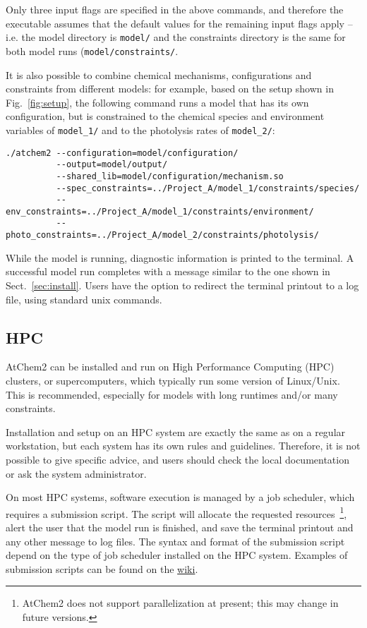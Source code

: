 Only three input flags are specified in the above commands, and
therefore the executable assumes that the default values for the
remaining input flags apply -- i.e. the model directory is
\texttt{model/} and the constraints directory is the same for both
model runs (\texttt{model/constraints/}.

It is also possible to combine chemical mechanisms, configurations and
constraints from different models: for example, based on the setup
shown in Fig.~\ref{fig:setup}, the following command runs a model that
has its own configuration, but is constrained to the chemical species
and environment variables of \texttt{model\_1/} and to the photolysis
rates of \texttt{model\_2/}:

\begin{verbatim}
./atchem2 --configuration=model/configuration/
          --output=model/output/
          --shared_lib=model/configuration/mechanism.so
          --spec_constraints=../Project_A/model_1/constraints/species/
          --env_constraints=../Project_A/model_1/constraints/environment/
          --photo_constraints=../Project_A/model_2/constraints/photolysis/
\end{verbatim}

While the model is running, diagnostic information is printed to the
terminal. A successful model run completes with a message similar to
the one shown in Sect.~\ref{sec:install}. Users have the option to
redirect the terminal printout to a log file, using standard unix
commands.

\subsection{HPC} \label{subsec:hpc}

AtChem2 can be installed and run on High Performance Computing (HPC)
clusters, or supercomputers, which typically run some version of
Linux/Unix. This is recommended, especially for models with long
runtimes and/or many constraints.

Installation and setup on an HPC system are exactly the same as on a
regular workstation, but each system has its own rules and
guidelines. Therefore, it is not possible to give specific advice, and
users should check the local documentation or ask the system
administrator.

On most HPC systems, software execution is managed by a job scheduler,
which requires a submission script. The script will allocate the
requested resources~\footnote{AtChem2 does not support parallelization
  at present; this may change in future versions.}, alert the user
that the model run is finished, and save the terminal printout and any
other message to log files. The syntax and format of the submission
script depend on the type of job scheduler installed on the HPC
system. Examples of submission scripts can be found on the
\href{https://github.com/AtChem/AtChem2/wiki/Running-on-HPC}{wiki}.

